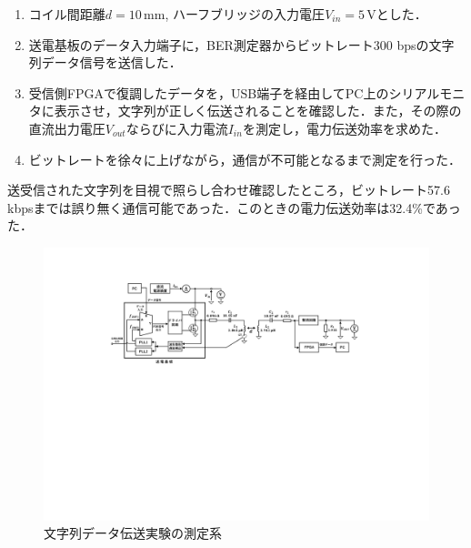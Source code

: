 \begin{enumerate} \setlength{\itemsep}{-0.2cm}
  \item コイル間距離$d =10 \, \mathrm{mm}$, ハーフブリッジの入力電圧$V_{in}=5 \, \mathrm{V}$とした．
  \item 送電基板のデータ入力端子に，BER測定器からビットレート300 bpsの文字列データ信号を送信した．
  \item 受信側FPGAで復調したデータを，USB端子を経由してPC上のシリアルモニタに表示させ，文字列が正しく伝送されることを確認した．また，その際の直流出力電圧$V_{out}$ならびに入力電流$I_{in}$を測定し，電力伝送効率を求めた．
  \item ビットレートを徐々に上げながら，通信が不可能となるまで測定を行った．
  \end{enumerate}
送受信された文字列を目視で照らし合わせ確認したところ，ビットレート57.6 kbpsまでは誤り無く通信可能であった．このときの電力伝送効率は32.4\%であった．
\begin{figure}[h]
\begin{center}

\includegraphics[width=160mm]{figures/communication.pdf}
  \caption{文字列データ伝送実験の測定系}
  \label{communication}

  \end{center}
\end{figure}


